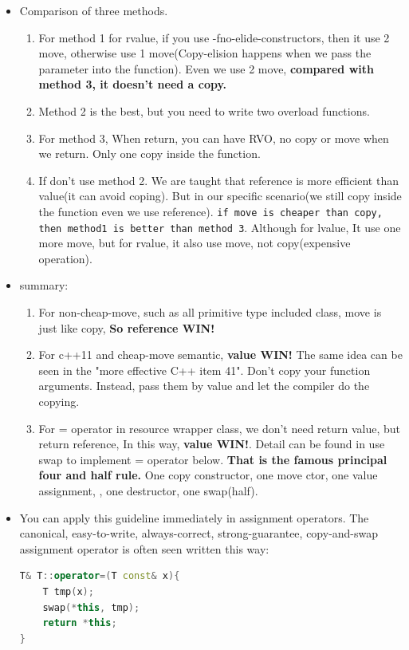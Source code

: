 \documentclass[a4paper,11pt,twoside]{book}
\begin{document}
\begin{itemize}
\item Comparison of three methods. 
\begin{enumerate}
	\item For method 1 for rvalue,  if you use -fno-elide-constructors, then it use 2 move, otherwise use 1 move(Copy-elision happens when we pass the parameter into the function). Even we use 2 move, \textbf{compared with method 3, it doesn't need a copy.}
	
	\item Method 2 is the best, but you need to write two overload functions.
	
	\item For method 3, When return, you can have RVO, no copy or move when we return. Only one copy inside the function.
	
	\item If don’t use method 2.  We are taught that reference is more efficient than value(it can avoid coping). But in our specific scenario(we still copy inside the function even we use reference). \texttt{if move is cheaper than copy, then method1 is better than method 3}. Although for lvalue, It use one more move, but for rvalue, it also use move, not copy(expensive operation).
	  
\end{enumerate}


\item summary:
\begin{enumerate}
	
	\item For non-cheap-move, such as all primitive type included class, move is just like copy, \textbf{So reference WIN!}
	
	\item For c++11 and cheap-move semantic, \textbf{value WIN!} The same idea can be seen in the "more effective C++ item 41". Don’t copy your function arguments. Instead, pass them by value and let the compiler do the copying. 
	
	\item For = operator in resource wrapper class, we don't need return value, but return reference, In this way, \textbf{value WIN!}. Detail can be found in use swap to implement = operator below. \textbf{That is the famous principal four and half rule.} One copy constructor, one move ctor, one value assignment, , one destructor, one swap(half).
	
\end{enumerate}

\item You can apply this guideline immediately in assignment operators. The canonical, easy-to-write, always-correct, strong-guarantee, copy-and-swap assignment operator is often seen written this way:
\begin{lstlisting}[frame=single, language=c++]
T& T::operator=(T const& x){ 
	T tmp(x);          
	swap(*this, tmp);  
	return *this;      
}


\end{lstlisting}
\end{itemize}
\end{document}
